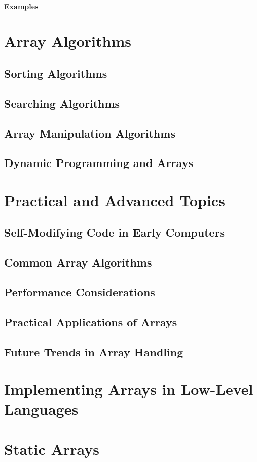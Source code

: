 \documentclass[12pt, oneside]{book}
\begin{document}
\subsubsection{Examples}
\chapter{Array Algorithms}
\section{Sorting Algorithms}
\section{Searching Algorithms}
\section{Array Manipulation Algorithms}
\section{Dynamic Programming and Arrays}
\chapter{Practical and Advanced Topics}
\section{Self-Modifying Code in Early Computers}
\section{Common Array Algorithms}
\section{Performance Considerations}
\section{Practical Applications of Arrays}
\section{Future Trends in Array Handling}
\chapter{Implementing Arrays in Low-Level Languages}
\chapter{Static Arrays}
\end{document}

